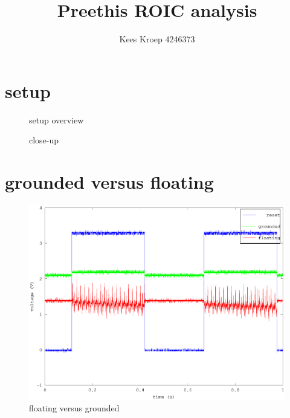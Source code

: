 \documentclass{article}
\title{Preethis ROIC analysis}
\author{Kees Kroep 4246373}
\begin{document}
  \maketitle

\section{setup}\label{sec:setup}

\begin{figure}[h]
	\centering
	\caption{setup overview}
	\label{fig:setup_overview}
\end{figure}

\begin{figure}[h]
	\centering
	\caption{close-up}
	\label{fig:close-up}
\end{figure}

\section{grounded versus floating}
\begin{figure}[h]
	\centering
	\includegraphics[width=\linewidth]{fig/grounded_floating.eps}
	\caption{floating versus grounded}
	\label{fig:floating_vs_grounded}
\end{figure}
\end{document}
